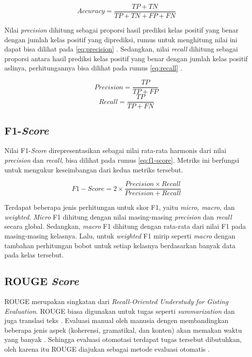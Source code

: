 \begin{equation}
    Accuracy = \frac{TP + TN}{TP + TN + FP + FN}
    \label{eq:accuracy}
\end{equation}

Nilai \textit{precision} dihitung sebagai proporsi hasil prediksi kelas positif yang benar dengan jumlah kelas positif yang diprediksi, rumus untuk menghitung nilai ini dapat bisa dilihat pada \ref{eq:precision} \parencite{metrics}. Sedangkan, nilai \textit{recall} dihitung sebagai proporsi antara hasil prediksi kelas positif yang benar dengan jumlah kelas positif aslinya, perhitungannya bisa dilihat pada rumus \ref{eq:recall} \parencite{metrics}.

\begin{equation}
    Precision = \frac{TP}{TP + FP}
    \label{eq:precision}
\end{equation}
\begin{equation}
    Recall = \frac{TP}{TP + FN}
    \label{eq:recall}
\end{equation}

\subsection{F1-\textit{Score}}
Nilai F1-\textit{Score} direpresentasikan sebagai nilai rata-rata harmonis dari nilai \textit{precision} dan \textit{recall}, bisa dilihat pada rumus \ref{eq:f1-score}. Metriks ini berfungsi untuk mengukur keseimbangan dari kedua metriks tersebut.

\begin{equation}
    F1-Score = 2 \times \frac{Precision \times Recall}{Precision + Recall}
    \label{eq:f1-score}
\end{equation}

Terdapat beberapa jenis perhitungan untuk skor F1, yaitu \textit{micro, macro}, dan \textit{weighted}. \textit{Micro} F1 dihitung dengan nilai masing-masing \textit{precision} dan \textit{recall} secara global. Sedangkan, \textit{macro} F1 dihitung dengan rata-rata dari nilai F1 pada masing-masing kelasnya. Lalu, untuk \textit{weighted} F1 mirip seperti \textit{macro} dengan tambahan perhitungan bobot untuk setiap kelasnya berdasarkan banyak data pada kelas tersebut.

\subsection{ROUGE \textit{Score}}

ROUGE merupakan singkatan dari \textit{Recall-Oriented Understudy for Gisting Evaluation}. ROUGE biasa digunakan untuk tugas seperti \textit{summarization} dan juga translasi teks \parencite{rouge}. Evaluasi manual oleh manusia dengen membandingkan beberapa jenis aspek (koherensi, gramatikal, dan konten) akan memakan waktu yang banyak \parencite{rouge}. Sehingga evaluasi otomotasi terdapat tugas tersebut dibutuhkan, oleh karena itu ROUGE diajukan sebagai metode evaluasi otomatis \parencite{rouge}.

